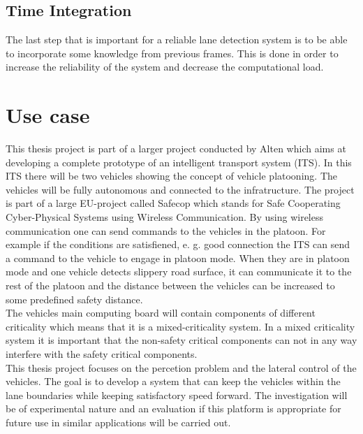 \subsection{Time Integration}
The last step that is important for a reliable lane detection system is to be able to incorporate some knowledge from previous frames. This is done in order to increase the reliability of the system and decrease the computational load.


\section{Use case}
This thesis project is part of a larger project conducted by Alten which aims at developing a complete prototype of an intelligent transport system (ITS). In this ITS there will be two vehicles showing the concept of vehicle platooning. The vehicles will be fully autonomous and connected to the infratructure. The project is part of a large EU-project called Safecop which stands for Safe Cooperating Cyber-Physical Systems using Wireless Communication. By using wireless communication one can send commands to the vehicles in the platoon. For example if the conditions are satisfiened, e. g. good connection the ITS can send a command to the vehicle to engage in platoon mode. When they are in platoon mode and one vehicle detects slippery road surface, it can communicate it to the rest of the platoon and the distance between the vehicles can be increased to some predefined safety distance.\\

The vehicles main computing board will contain components of different criticality which means that it is a mixed-criticality system. In a mixed criticality system it is important that the non-safety critical components can not in any way interfere with the safety critical components.\\


This thesis project focuses on the percetion problem and the lateral control of the vehicles. The goal is to develop a system that can keep the vehicles within the lane boundaries while keeping satisfactory speed forward. The investigation will be of experimental nature and an evaluation if this platform is appropriate for future use in similar applications will be carried out.




